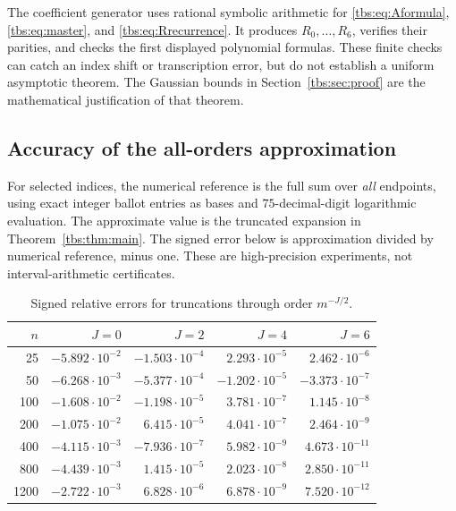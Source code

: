 \documentclass[11pt,a4paper]{article}
\numberwithin{equation}{section}
\theoremstyle{definition}
\begin{document}
The coefficient generator uses rational symbolic arithmetic for
\eqref{tbs:eq:Aformula}, \eqref{tbs:eq:master}, and \eqref{tbs:eq:Rrecurrence}.
It produces $R_0,\ldots,R_6$, verifies their parities, and checks the
first displayed polynomial formulas. These finite checks can catch an
index shift or transcription error, but do not establish a uniform
asymptotic theorem. The Gaussian bounds in Section~\ref{tbs:sec:proof}
are the mathematical justification of that theorem.

\subsection{Accuracy of the all-orders approximation}
For selected indices, the numerical reference is the full sum over
\emph{all} endpoints, using exact integer ballot entries as bases and
$75$-decimal-digit logarithmic evaluation. The approximate value is the
truncated expansion in Theorem~\ref{tbs:thm:main}. The signed error below
is approximation divided by numerical reference, minus one. These are
high-precision experiments, not interval-arithmetic certificates.

\begin{table}[htb]
\centering\small
\begin{tabular}{@{}r r r r r@{}}
\toprule
$n$ & $J=0$ & $J=2$ & $J=4$ & $J=6$\\
\midrule
25 & $-5.892\cdot10^{-2}$ & $-1.503\cdot10^{-4}$ & $2.293\cdot10^{-5}$ & $2.462\cdot10^{-6}$\\
50 & $-6.268\cdot10^{-3}$ & $-5.377\cdot10^{-4}$ & $-1.202\cdot10^{-5}$ & $-3.373\cdot10^{-7}$\\
100 & $-1.608\cdot10^{-2}$ & $-1.198\cdot10^{-5}$ & $3.781\cdot10^{-7}$ & $1.145\cdot10^{-8}$\\
200 & $-1.075\cdot10^{-2}$ & $6.415\cdot10^{-5}$ & $4.041\cdot10^{-7}$ & $2.464\cdot10^{-9}$\\
400 & $-4.115\cdot10^{-3}$ & $-7.936\cdot10^{-7}$ & $5.982\cdot10^{-9}$ & $4.673\cdot10^{-11}$\\
800 & $-4.439\cdot10^{-3}$ & $1.415\cdot10^{-5}$ & $2.023\cdot10^{-8}$ & $2.850\cdot10^{-11}$\\
1200 & $-2.722\cdot10^{-3}$ & $6.828\cdot10^{-6}$ & $6.878\cdot10^{-9}$ & $7.520\cdot10^{-12}$\\
\bottomrule
\end{tabular}
\caption{Signed relative errors for truncations through order $m^{-J/2}$.}
\label{tbs:tab:errors}
\end{table}
\end{document}
